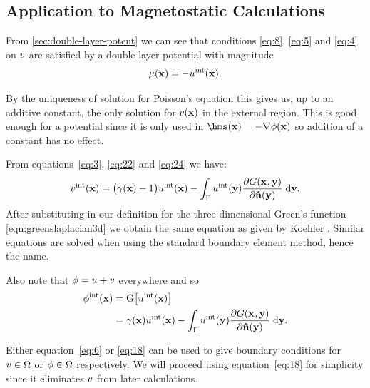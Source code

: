 \subsection{Application to Magnetostatic Calculations}
\label{sec:appl-magn-calc}

From \autoref{sec:double-layer-potent} we can see that conditions \eqref{eq:8}, \eqref{eq:5} and \eqref{eq:4} on $v$ are satisfied by a double layer potential with magnitude
\begin{equation}
  \label{eq:24}
  \mu(\mathbf{x}) = - u^{\text{int}}(\mathbf{x}).
\end{equation}

By the uniqueness of solution for Poisson's equation this gives us, up to an additive constant, the only solution for $v(\mathbf{x})$ in the external region.
This is good enough for a potential since it is only used in $\hms(\xv) = - \nabla \phim(\xv)$ so addition of a constant has no effect.

From equations~\eqref{eq:3}, \eqref{eq:22} and \eqref{eq:24} we have:
\begin{equation}
  \label{eq:6}
  v^{\text{int}}(\mathbf{x}) =  \big(\gamma(\mathbf{x}) - 1 \big) u^{\text{int}}(\mathbf{x})
  - \int_{{\Gamma}} u^{\text{int}}(\mathbf{y}) \frac{\partial G(\mathbf{x}_{},\mathbf{y})}{\partial \mathbf{\hat{n}}(\mathbf{y})} {\; \text{d}} \mathbf{y}.
\end{equation}
After substituting in our definition for the three dimensional Green's function \eqref{eqn:greenslaplacian3d} we obtain the same equation as given by Koehler \cite{Koehler1997}.
Similar equations are solved when using the standard boundary element method, hence the name.

Also note that $\phi = u + v$ everywhere and so
\begin{align}
  \label{eq:18}
  \phi^{\text{int}}(\mathbf{x}) &= {\mathbf{\mathrm{G}}} \big[ u^{\text{int}}(\mathbf{x}) \big] \\
  &= \gamma(\mathbf{x}) u^{\text{int}}(\mathbf{x})
  - \int_{{\Gamma}} u^{\text{int}}(\mathbf{y}) \frac{\partial G(\mathbf{x}_{},\mathbf{y})}{\partial \mathbf{\hat{n}}(\mathbf{y})} {\; \text{d}} \mathbf{y}. \notag
\end{align}

Either equation~\eqref{eq:6} or \eqref{eq:18} can be used to give boundary conditions for $v \in \Omega$ or $\phi \in \Omega$ respectively.
We will proceed using equation~\eqref{eq:18} for simplicity since it eliminates $v$ from later calculations.

